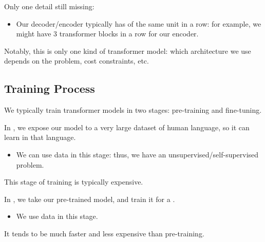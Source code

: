         Only one detail still missing:

        \begin{itemize}
            \item Our decoder/encoder typically has  of the same unit in a row: for example, we might have 3 transformer blocks in a row for our encoder.
        \end{itemize}

        Notably, this is only one kind of transformer model: which architecture we use depends on the problem, cost constraints, etc.
            
        

        

        

    \pagebreak

    \subsection{Training Process}

        We typically train transformer models in two stages: pre-training and fine-tuning.\\

        \begin{definition}
            In , we expose our model to a very large dataset of human language, so it can learn  in that language.

            \begin{itemize}
                \item We can use  data in this stage: thus, we have an unsupervised/self-supervised problem.
            \end{itemize}

            This stage of training is typically expensive.
        \end{definition}

        \phantom{}

        \begin{definition}
            In , we take our pre-trained model, and train it for a .

            \begin{itemize}
                \item We use  data in this stage.
            \end{itemize}

            It tends to be much faster and less expensive than pre-training.
        \end{definition}

